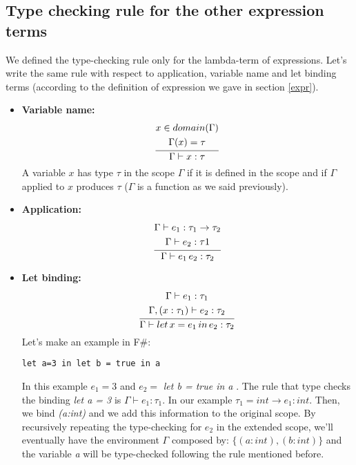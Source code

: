 \subsection{Type checking rule for the other expression terms}
We defined the type-checking rule only for the lambda-term of expressions. Let's write the same rule with respect to application, variable name and let binding terms (according to the definition of expression we gave in section \ref{expr}). 
\begin{itemize}
    \item \textbf{Variable name:} 
    \[ \infer{\Gamma \vdash x : \tau}{ \begin{gathered} x \in domain(\Gamma)\\ \Gamma(x) = \tau \end{gathered}} \]
    A variable $x$ has type $\tau$ in the scope $\Gamma$ if it is defined in the scope and if $\Gamma$ applied to $x$ produces $\tau$ ($\Gamma$ is a function as we said previously).
    \item \textbf{Application:} 
    \[ \infer{\Gamma \vdash e_{1} \, e_{2} : \tau_{2}}{\begin{gathered} \Gamma \vdash e_{1} : \tau_{1} \rightarrow \tau_{2} \\ \Gamma \vdash e_{2} : \tau{1} \end{gathered}}\]

    \item \textbf{Let binding:}
    \[ \infer{\Gamma \vdash let \, x = e_{1} \, in \, e_{2} : \tau_{2}}{\begin{gathered}
        \Gamma \vdash e_{1} : \tau_{1}\\
        \Gamma, (x:\tau_{1}) \vdash e_{2}:\tau_{2}
    \end{gathered}}\]
    Let's make an example in F\#:
    \begin{lstlisting}[style=FSharpStyle]
        let a=3 in let b = true in a
    \end{lstlisting}
    In this example $e_{1} = 3$ and $e_{2} =$ \textit{let b = true in a }. The rule that type checks the binding \textit{let a = 3} is $\Gamma \vdash e_{1}:\tau_{1}$. In our example $\tau_{1}=int \rightarrow e_{1}:int$. Then, we bind \textit{(a:int)} and we add this information to the original scope. By recursively repeating the type-checking for $e_{2}$ in the extended scope, we'll eventually have the environment $\Gamma$ composed by: $\{(a:int), (b:int)\}$ and the variable \textit{a}
    will be type-checked following the rule mentioned before. 
\end{itemize}

